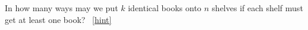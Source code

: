 \documentclass{book}
\begin{document}
\setcounter{project}{127}
\addtocounter{project}{-1}
\begin{activity}[]\label{activity-120}
\hypertarget{p-911}{}%
In how many ways may we put \(k\) identical books onto \(n\) shelves if each shelf must get at least one book?%
~\hfill{\tiny\hyperlink{a-127}{[hint]}\hypertarget{q-127}{}}\end{activity}
\end{document}
